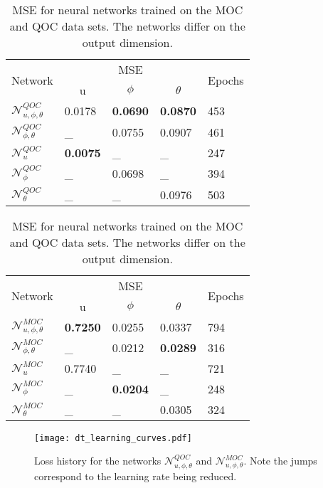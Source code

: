 \documentclass[graybox]{svmult}
\begin{document}
\begin{table}[t]
\centering
\begin{tabular}[t]{|l||l|l|l||l|}
\hline
\multirow{2}{*}{Network} & \multicolumn{3}{c||}{MSE} & \multirow{2}{*}{Epochs} \\ \cline{2-4}
                         & \multicolumn{1}{c|}{u} & \multicolumn{1}{c|}{$\phi$} & \multicolumn{1}{c||}{$\theta$} & \\ \hline
$\mathcal N^{QOC}_{u, \phi, \theta}$ &0.0178 &\bf{0.0690} &\bf{0.0870} &453 \\ \hline
$\mathcal N^{QOC}_{\phi, \theta}$ &\_ &0.0755 &0.0907 &461 \\ \hline
$\mathcal N^{QOC}_{u}$ &\bf{0.0075} &\_ &\_ &247\\ \hline
$\mathcal N^{QOC}_{\phi}$ &\_ &0.0698 &\_ &394 \\ \hline
$\mathcal N^{QOC}_{\theta}$ &\_ &\_ &0.0976 &503 \\ \hline
\end{tabular}
\quad
\begin{tabular}[t]{|l||l|l|l||l|}
\hline
\multirow{2}{*}{Network} & \multicolumn{3}{c||}{MSE} & \multirow{2}{*}{Epochs} \\ \cline{2-4}
                         & \multicolumn{1}{c|}{u} & \multicolumn{1}{c|}{$\phi$} & \multicolumn{1}{c||}{$\theta$} & \\ \hline
$\mathcal N^{MOC}_{u, \phi, \theta}$ &\bf{0.7250} &0.0255 &0.0337 &794 \\ \hline
$\mathcal N^{MOC}_{\phi, \theta}$ &\_ &0.0212 &\bf{0.0289} &316 \\ \hline
$\mathcal N^{MOC}_{u}$ &0.7740 &\_ &\_ &721\\ \hline
$\mathcal N^{MOC}_{\phi}$ &\_ &\bf{0.0204} &\_ &248 \\ \hline
$\mathcal N^{MOC}_{\theta}$ &\_ &\_ &0.0305 &324 \\ \hline
\end{tabular}
\caption{MSE for neural networks trained on the MOC and QOC data sets. The networks differ on the output dimension.}
\label{tab:res}
\end{table}

\begin{figure}[t]
\sidecaption
\texttt{[image: dt\_learning\_curves.pdf]}
\caption{Loss history for the networks $\mathcal N^{QOC}_{u, \phi, \theta}$ and $\mathcal N^{MOC}_{u, \phi, \theta}$. Note the jumps correspond to the learning rate being reduced.}
\label{fig:training_loss}
\end{figure}
\end{document}

